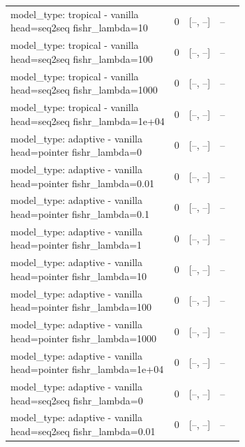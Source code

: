 \documentclass[10pt]{article}
\makeatletter
\newcommand{\stackcell}[1]{\begin{tabular}[t]{@{}l@{}}#1\end{tabular}}
\makeatother
\begin{document}
{\begin{longtable}{lrrrl}
\stackcell{model\_type: tropical - vanilla\\\footnotesize head=seq2seq fishr\_lambda=10 } & 0 & [--, --] & -- & \\
\stackcell{model\_type: tropical - vanilla\\\footnotesize head=seq2seq fishr\_lambda=100 } & 0 & [--, --] & -- & \\
\stackcell{model\_type: tropical - vanilla\\\footnotesize head=seq2seq fishr\_lambda=1000 } & 0 & [--, --] & -- & \\
\stackcell{model\_type: tropical - vanilla\\\footnotesize head=seq2seq fishr\_lambda=1e+04 } & 0 & [--, --] & -- & \\
\stackcell{model\_type: adaptive - vanilla\\\footnotesize head=pointer fishr\_lambda=0 } & 0 & [--, --] & -- & \\
\stackcell{model\_type: adaptive - vanilla\\\footnotesize head=pointer fishr\_lambda=0.01 } & 0 & [--, --] & -- & \\
\stackcell{model\_type: adaptive - vanilla\\\footnotesize head=pointer fishr\_lambda=0.1 } & 0 & [--, --] & -- & \\
\stackcell{model\_type: adaptive - vanilla\\\footnotesize head=pointer fishr\_lambda=1 } & 0 & [--, --] & -- & \\
\stackcell{model\_type: adaptive - vanilla\\\footnotesize head=pointer fishr\_lambda=10 } & 0 & [--, --] & -- & \\
\stackcell{model\_type: adaptive - vanilla\\\footnotesize head=pointer fishr\_lambda=100 } & 0 & [--, --] & -- & \\
\stackcell{model\_type: adaptive - vanilla\\\footnotesize head=pointer fishr\_lambda=1000 } & 0 & [--, --] & -- & \\
\stackcell{model\_type: adaptive - vanilla\\\footnotesize head=pointer fishr\_lambda=1e+04 } & 0 & [--, --] & -- & \\
\stackcell{model\_type: adaptive - vanilla\\\footnotesize head=seq2seq fishr\_lambda=0 } & 0 & [--, --] & -- & \\
\stackcell{model\_type: adaptive - vanilla\\\footnotesize head=seq2seq fishr\_lambda=0.01 } & 0 & [--, --] & -- & \\

\end{longtable}}
\end{document}
